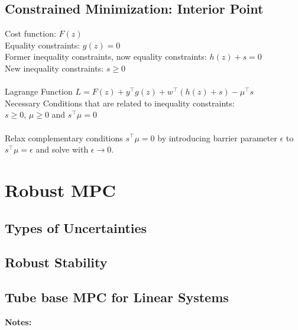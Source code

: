 \documentclass[english]{latex4ei/latex4ei_sheet}
\begin{document}
\begin{sectionbox}
\subsection{Constrained Minimization: Interior Point}
Cost function: $F(z)$\\
Equality constraints: $g(z)=0$\\
Former inequality constraints, now equality constraints: $h(z)+s=0$\\
New inequality constraints: $s\geq 0$\\
\\
Lagrange Function $L=F(z)+y^{\top}g(z)+w^{\top}(h(z)+s)-\mu^{\top}s$\\
Necessary Conditions that are related to inequality constraints:\\
$s \geq 0 $, $\mu \geq 0$ and $s^{\top}\mu=0$\\
\\
Relax complementary conditions $s^{\top}\mu=0$ by introducing barrier parameter $\epsilon$ to $s^{\top}\mu=\epsilon$ and solve with $\epsilon \rightarrow 0$.
\end{sectionbox}


\section{Robust MPC}
\begin{sectionbox}

\subsection{Types of Uncertainties}

\subsection{Robust Stability}

\subsection{Tube base MPC for Linear Systems}

\end{sectionbox}
\textbf{Notes:}

\end{document}
